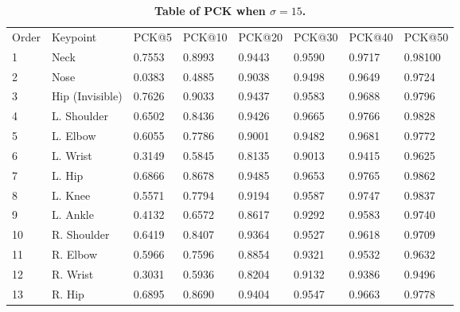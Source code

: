 \documentclass[10pt,letterpaper]{article}
\newlength\savedwidth
\newcommand\thickhline{\noalign{\global\savedwidth\arrayrulewidth\global\arrayrulewidth 2pt}%
	\hline
	\noalign{\global\arrayrulewidth\savedwidth}}
\begin{document}
	
\begin{table}[!ht]
\begin{adjustwidth}{-2.25in}{0in} %
	\centering
	\caption{
		{\bf Table of PCK when $\sigma=15$.}}
	\begin{tabular}{|l|l|l|l|l|l|l|l|}
		\hline
		Order & Keypoint & PCK@5 & PCK@10 & PCK@20 & PCK@30 & PCK@40 & PCK@50 \\ \thickhline
		1     &  Neck       & 0.7553      &  0.8993      &  0.9443      & 0.9590       &   0.9717     & 0.98100       \\ \hline
		2     &  Nose        & 0.0383      &  0.4885      &  0.9038      &  0.9498      &   0.9649     & 0.9724        \\ \hline
		3     &  Hip (Invisible)        & 0.7626      &  0.9033      &  0.9437      & 0.9583       &  0.9688      & 0.9796       \\ \hline
		4     &  L. Shoulder         & 0.6502      & 0.8436       & 0.9426       & 0.9665       &  0.9766      & 0.9828       \\ \hline
		5     &  L. Elbow        & 0.6055      &  0.7786      &  0.9001      &  0.9482      &  0.9681      &  0.9772      \\ \hline
		6     &  L. Wrist        & 0.3149      &  0.5845      &  0.8135      &  0.9013      &  0.9415      &  0.9625      \\ \hline
		7     &  L. Hip        &  0.6866     &   0.8678     &  0.9485      & 0.9653       &  0.9765      &  0.9862      \\ \hline
		8     &  L. Knee         & 0.5571      &  0.7794      &  0.9194      & 0.9587       &  0.9747      &  0.9837      \\ \hline
		9     &  L. Ankle         &  0.4132     &  0.6572      &   0.8617     &   0.9292     &  0.9583      & 0.9740       \\ \hline
		10    &  R. Shoulder        & 0.6419      &  0.8407      &  0.9364      & 0.9527       & 0.9618       &  0.9709      \\ \hline
		11    &  R. Elbow        & 0.5966      &  0.7596      &  0.8854      &  0.9321      &  0.9532      &  0.9632      \\ \hline
		12    &  R. Wrist        & 0.3031      &  0.5936      &  0.8204      &  0.9132      &  0.9386      &  0.9496      \\ \hline
		13    &  R. Hip        & 0.6895      &   0.8690     &  0.9404      &  0.9547      &    0.9663    &   0.9778     \\ \hline

\end{tabular}
\end{adjustwidth}
\end{table}
\end{document}
